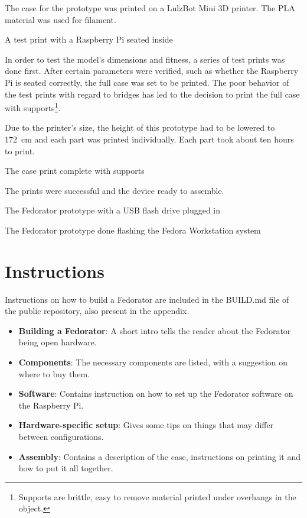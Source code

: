         The case for the prototype was printed on a LulzBot Mini \cite{lulzbot-mini} 3D printer.  The PLA material was used for filament.
        
            {A test print with a Raspberry Pi seated inside}
        
        In order to test the model's dimensions and fitness, a series of test prints was done first.  After certain parameters were verified, such as whether the Raspberry Pi is seated correctly, the full case was set to be printed.  The poor behavior of the test prints with regard to bridges has led to the decision to print the full case with supports\footnote{Supports are brittle, easy to remove material printed under overhangs in the object.}.
        
        Due to the printer's size, the height of this prototype had to be lowered to 172~cm and each part was printed individually.  Each part took about ten hours to print.%
        
            {The case print complete with supports}
        
        The prints were successful and the device ready to assemble.
        
        \newpage
        
        
            {The Fedorator prototype with a USB flash drive plugged in}
            
            {The Fedorator prototype done flashing the Fedora Workstation system}
        
        \newpage
        
        
    \section{Instructions}
        Instructions on how to build a Fedorator are included in the BUILD.md file of the public repository, also present in the appendix.
        
        \begin{itemize}
            \item \textbf{Building a Fedorator}: A short intro tells the reader about the Fedorator being open hardware.
            \item \textbf{Components}: The necessary components are listed, with a suggestion on where to buy them.
            \item \textbf{Software}: Contains instruction on how to set up the Fedorator software on the Raspberry Pi.
            \item \textbf{Hardware-specific setup}: Gives some tips on things that may differ between configurations.
            \item \textbf{Assembly}: Contains a description of the case, instructions on printing it and how to put it all together.
        \end{itemize}
        
